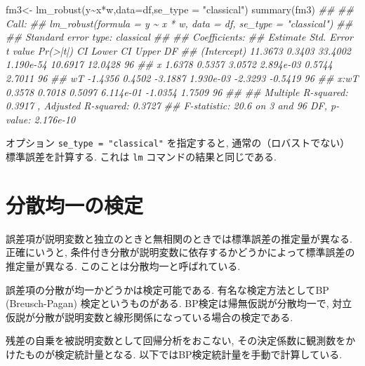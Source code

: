 \documentclass[
  letterpaper,
  xelatex,
  ja=standard, xelatex]{bxjsbook}
\newenvironment{Shaded}{\begin{snugshade}}{\end{snugshade}}
\newcommand{\AttributeTok}[1]{\textcolor[rgb]{0.40,0.45,0.13}{#1}}
\newcommand{\DocumentationTok}[1]{\textcolor[rgb]{0.37,0.37,0.37}{\textit{#1}}}
\newcommand{\FunctionTok}[1]{\textcolor[rgb]{0.28,0.35,0.67}{#1}}
\newcommand{\NormalTok}[1]{\textcolor[rgb]{0.00,0.23,0.31}{#1}}
\newcommand{\OtherTok}[1]{\textcolor[rgb]{0.00,0.23,0.31}{#1}}
\newcommand{\SpecialCharTok}[1]{\textcolor[rgb]{0.37,0.37,0.37}{#1}}
\newcommand{\StringTok}[1]{\textcolor[rgb]{0.13,0.47,0.30}{#1}}
\begin{document}
\begin{Shaded}
\begin{Highlighting}[]
\NormalTok{fm3}\OtherTok{\textless{}{-}} \FunctionTok{lm\_robust}\NormalTok{(y}\SpecialCharTok{\textasciitilde{}}\NormalTok{x}\SpecialCharTok{*}\NormalTok{w,}\AttributeTok{data=}\NormalTok{df,}\AttributeTok{se\_type =} \StringTok{"classical"}\NormalTok{)}
\FunctionTok{summary}\NormalTok{(fm3)}
\DocumentationTok{\#\# }
\DocumentationTok{\#\# Call:}
\DocumentationTok{\#\# lm\_robust(formula = y \textasciitilde{} x * w, data = df, se\_type = "classical")}
\DocumentationTok{\#\# }
\DocumentationTok{\#\# Standard error type:  classical }
\DocumentationTok{\#\# }
\DocumentationTok{\#\# Coefficients:}
\DocumentationTok{\#\#             Estimate Std. Error t value  Pr(\textgreater{}|t|) CI Lower CI Upper DF}
\DocumentationTok{\#\# (Intercept)  11.3673     0.3403 33.4002 1.190e{-}54  10.6917  12.0428 96}
\DocumentationTok{\#\# x             1.6378     0.5357  3.0572 2.894e{-}03   0.5744   2.7011 96}
\DocumentationTok{\#\# wT           {-}1.4356     0.4502 {-}3.1887 1.930e{-}03  {-}2.3293  {-}0.5419 96}
\DocumentationTok{\#\# x:wT          0.3578     0.7018  0.5097 6.114e{-}01  {-}1.0354   1.7509 96}
\DocumentationTok{\#\# }
\DocumentationTok{\#\# Multiple R{-}squared:  0.3917 ,    Adjusted R{-}squared:  0.3727 }
\DocumentationTok{\#\# F{-}statistic:  20.6 on 3 and 96 DF,  p{-}value: 2.176e{-}10}
\end{Highlighting}
\end{Shaded}

オプション \texttt{se\_type\ =\ "classical"} を指定すると,
通常の（ロバストでない）標準誤差を計算する. これは \texttt{lm}
コマンドの結果と同じである.

\section{分散均一の検定}\label{ux5206ux6563ux5747ux4e00ux306eux691cux5b9a}

誤差項が説明変数と独立のときと無相関のときでは標準誤差の推定量が異なる.
正確にいうと,
条件付き分散が説明変数に依存するかどうかによって標準誤差の推定量が異なる.
このことは分散均一と呼ばれている.

誤差項の分散が均一かどうかは検定可能である. 有名な検定方法としてBP
(Breusch-Pagan) 検定というものがある. BP検定は帰無仮説が分散均一で,
対立仮説が分散が説明変数と線形関係になっている場合の検定である.

残差の自乗を被説明変数として回帰分析をおこない,
その決定係数に観測数をかけたものが検定統計量となる.
以下ではBP検定統計量を手動で計算している.
\end{document}

